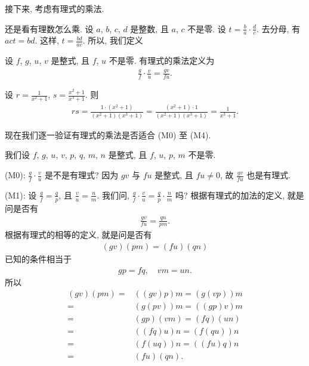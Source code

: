 接下来, 考虑有理式的乘法.

还是看有理数怎么乘. 设 $a$, $b$, $c$, $d$ 是整数, 且 $a$, $c$ 不是零. 设 $t = \frac{b}{a} \cdot \frac{d}{c}$. 去分母, 有 $act = bd$. 这样, $t = \frac{bd}{ac}$. 所以, 我们定义
\begin{definition}
    设 $f$, $g$, $u$, $v$ 是整式, 且 $f$, $u$ 不是零. 有理式的乘法定义为
    \begin{align*}
        \frac{g}{f} \cdot \frac{v}{u} = \frac{gv}{fu}.
    \end{align*}
\end{definition}

\begin{example}
    设 $r = \frac{1}{x^2 + 1}$, $s = \frac{x^2 + 1}{x^3 + 1}$. 则
    \begin{align*}
        rs = \frac{1 \cdot (x^2 + 1)}{(x^2 + 1)(x^3 + 1)} = \frac{(x^2 + 1) \cdot 1}{(x^2 + 1)(x^3 + 1)} = \frac{1}{x^3 + 1}.
    \end{align*}
\end{example}

现在我们逐一验证有理式的乘法是否适合 (M0) 至 (M4).

我们设 $f$, $g$, $u$, $v$, $p$, $q$, $m$, $n$ 是整式, 且 $f$, $u$, $p$, $m$ 不是零.

(M0): $\frac{g}{f} \cdot \frac{v}{u}$ 是不是有理式? 因为 $gv$ 与 $fu$ 是整式, 且 $fu \neq 0$, 故 $\frac{gv}{fu}$ 也是有理式.

(M1): 设 $\frac{g}{f} = \frac{q}{p}$, 且 $\frac{v}{u} = \frac{n}{m}$. 我们问, $\frac{g}{f} \cdot \frac{v}{u} = \frac{q}{p} \cdot \frac{n}{m}$ 吗? 根据有理式的加法的定义, 就是问是否有
\begin{align*}
    \frac{gv}{fu} = \frac{qn}{pm}.
\end{align*}
根据有理式的相等的定义, 就是问是否有
\begin{align*}
    (gv)(pm) = (fu)(qn)
\end{align*}
已知的条件相当于
\begin{align*}
    gp = fq, \quad vm = un.
\end{align*}
所以
\begin{align*}
    (gv)(pm)
    = {} & ((gv)p)m = (g(vp))m \\
    = {} & (g(pv))m = ((gp)v)m \\
    = {} & (gp)(vm) = (fq)(un) \\
    = {} & ((fq)u)n = (f(qu))n \\
    = {} & (f(uq))n = ((fu)q)n \\
    = {} & (fu)(qn).
\end{align*}

